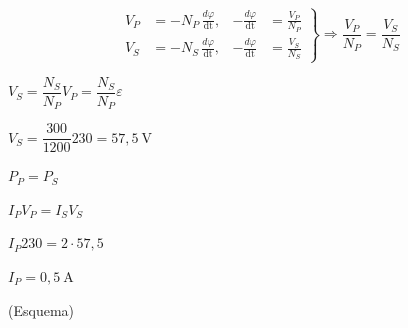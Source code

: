 \begin{solapartat}
\[ \left.\begin{aligned}
V_P &= -N_P\,\frac{d\varphi}{\mathrm{dt}}, & -\frac{d\varphi}{\mathrm{dt}} &= \frac{V_P}{N_P}\\
V_S &= -N_S\,\frac{d\varphi}{\mathrm{dt}}, & -\frac{d\varphi}{\mathrm{dt}} &= \frac{V_S}{N_S}
\end{aligned}\right\}\Rightarrow \frac{V_P}{N_P} = \frac{V_S}{N_S} \]

 $V_S = \dfrac{N_S}{N_P}V_P = \dfrac{N_S}{N_P}\varepsilon$

 $V_S = \dfrac{300}{1200}230 = 57,5\ \mathrm{V}$
\end{solapartat}

\begin{solapartat}
 $P_P = P_S$

 $I_P V_P = I_S V_S$

 $I_P 230 = 2\cdot 57,5$

 $I_P = 0,5\ \mathrm{A}$

 (Esquema)
\end{solapartat}
